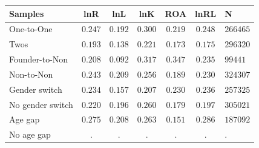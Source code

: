 \begin{tabular}{l*{5}{c}}
\hline\hline
Samples & lnR & lnL & lnK & ROA & lnRL & N \\
\hline
One-to-One & $0.247$ & $0.192$ & $0.300$ & $0.219$ & $0.248$ & $266465$ \\
Twos & $0.193$ & $0.138$ & $0.221$ & $0.173$ & $0.175$ & $296320$ \\
Founder-to-Non & $0.208$ & $0.092$ & $0.317$ & $0.347$ & $0.235$ & $99441$ \\
Non-to-Non & $0.243$ & $0.209$ & $0.256$ & $0.189$ & $0.230$ & $324307$ \\
Gender switch & $0.234$ & $0.157$ & $0.207$ & $0.230$ & $0.236$ & $257325$ \\
No gender switch & $0.220$ & $0.196$ & $0.260$ & $0.179$ & $0.197$ & $305021$ \\
Age gap & $0.275$ & $0.208$ & $0.263$ & $0.151$ & $0.286$ & $187092$ \\
No age gap & $.$ & $.$ & $.$ & $.$ & $.$ & $.$ \\
\hline\hline
\end{tabular}
